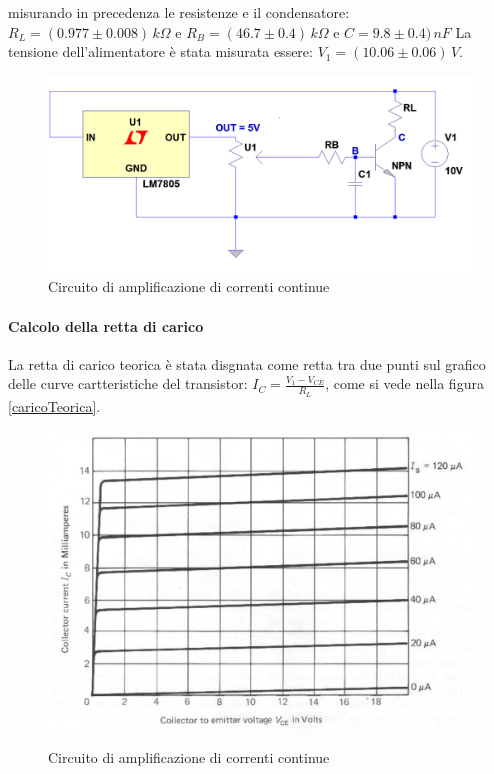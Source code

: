 \documentclass[10pt,a4paper]{article}
\begin{document}
misurando in precedenza le resistenze e il condensatore: $R_L = (0.977 \pm 0.008) \, k\Omega$ e $R_B= (46.7 \pm 0.4) \, k\Omega $ e $C=9.8 \pm 0.4) \, nF$
La tensione dell'alimentatore è stata misurata essere: $V_1 = (10.06 \pm 0.06) \, V$. 

\begin{figure}[!htb]
  \centering
  \includegraphics[scale=0.4]{circuito}
\caption{Circuito di amplificazione di correnti continue}
\label{circuito}
\end{figure}

\paragraph{Calcolo della retta di carico}
La retta di carico teorica è stata disgnata come retta tra due punti sul grafico delle curve cartteristiche del transistor: $I_C=\frac{V_1-V_{CE}}{R_L}$, come si vede nella figura
 \ref{caricoTeorica}.
 
\begin{figure}[!htb]
  \centering
  \includegraphics[scale=0.4]{rettaCarico.png} \label{caricoTeorica}
\caption{Circuito di amplificazione di correnti continue}
\label{circuito}
\end{figure}
 
\end{document}
